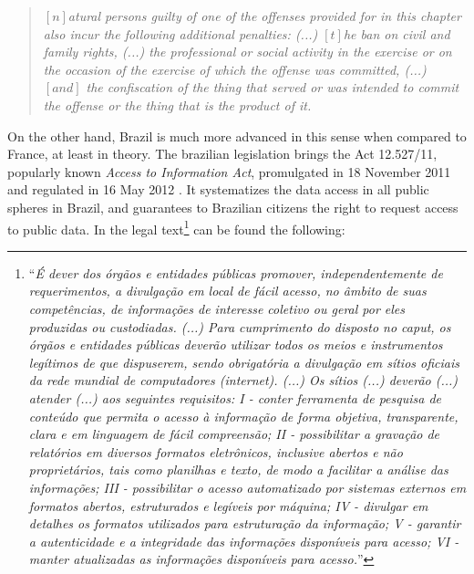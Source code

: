 \documentclass[a4paper]{exam}
\theoremstyle{plain}
\begin{document}
\begin{quote}
\textit{$\left[n\right]$atural persons guilty of one of the offenses provided for in this chapter also incur the following additional penalties: (...) $\left[t\right]$he ban on civil and family rights, (...) the professional or social activity in the exercise or on the occasion of the exercise of which the offense was committed, (...) $\left[and\right]$ the confiscation of the thing that served or was intended to commit the offense or the thing that is the product of it.}
\end{quote}
 
On the other hand, Brazil is much more advanced in this sense when compared to France, at least in theory. The brazilian legislation brings the Act 12.527/11, popularly known \textit{Access to Information Act}, promulgated in 18 November 2011 \cite{brasil2011lei} and regulated in 16 May 2012 \cite{brasil2012decreto}. It systematizes the data access in all public spheres in Brazil, and guarantees to Brazilian citizens the right to request access to public data. In the legal text\footnote{ ``\textit{É dever dos órgãos e entidades públicas promover, independentemente de requerimentos, a divulgação em local de fácil acesso, no âmbito de suas competências, de informações de interesse coletivo ou geral por eles produzidas ou custodiadas. (...) Para cumprimento do disposto no caput, os órgãos e entidades públicas deverão utilizar todos os meios e instrumentos legítimos de que dispuserem, sendo obrigatória a divulgação em sítios oficiais da rede mundial de computadores (internet). (...) Os sítios (...) deverão  (...) atender (...) aos seguintes requisitos: I - conter ferramenta de pesquisa de conteúdo que permita o acesso à informação de forma objetiva, transparente, clara e em linguagem de fácil compreensão; II - possibilitar a gravação de relatórios em diversos formatos eletrônicos, inclusive abertos e não proprietários, tais como planilhas e texto, de modo a facilitar a análise das informações; III - possibilitar o acesso automatizado por sistemas externos em formatos abertos, estruturados e legíveis por máquina; IV - divulgar em detalhes os formatos utilizados para estruturação da informação; V - garantir a autenticidade e a integridade das informações disponíveis para acesso; VI - manter atualizadas as informações disponíveis para acesso.}''} can be found the following:
\end{document}

